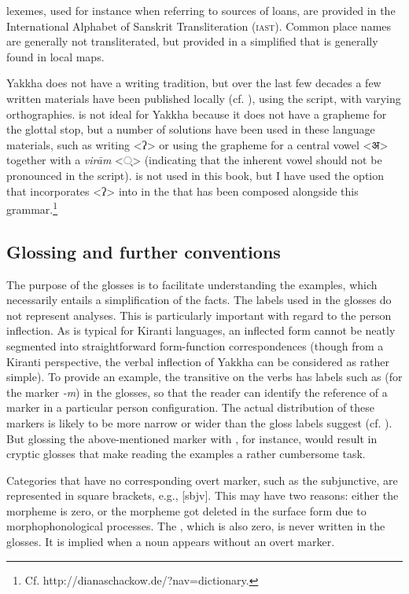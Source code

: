  lexemes, used for instance when referring to sources of loans, are provided in the International Alphabet of Sanskrit Transliteration (\textsc{iast}). Common place names are generally not transliterated, but provided in a simplified  that is generally found in local maps.

Yakkha does not have a writing tradition, but over the last few decades a few written materials have been published locally (cf. ), using the  script, with varying orthographies.  is not ideal for Yakkha because it does not have a grapheme for the glottal stop, but a number of solutions have been used in these language materials, such as writing <ʔ>  or using the grapheme for a central vowel <{\Deva अ}> together with a \emph{virām} <{\Deva  ्}>  (indicating that the inherent vowel should not be pronounced in the  script).   is not used in this book, but  I have used the option that incorporates <ʔ> into  in the  that has been composed alongside this grammar.\footnote{Cf. http://dianaschackow.de/?nav=dictionary.}


\subsection{Glossing and further conventions}

The purpose of the glosses is to facilitate understanding the examples, which necessarily entails a simplification of the facts. The labels used in the glosses do not represent analyses. This is particularly important with regard to the person inflection. As is typical for Kiranti languages, an inflected form cannot be neatly segmented into straightforward form-function correspondences (though from a  Kiranti perspective, the verbal inflection of Yakkha can be considered as rather simple). To provide an example, the transitive  on the verbs has labels such as  (for the marker \emph{-m}) in the glosses, so that the reader can identify the reference of a marker in a particular person configuration. The actual distribution of these markers is likely to be more narrow or wider than the gloss labels suggest (cf. ). But glossing the above-mentioned marker with , for instance, would result in cryptic glosses that make reading the examples a rather cumbersome task. 

Categories that have no corresponding overt marker, such as the subjunctive, are represented in square brackets, e.g., [{\sc sbjv}]. This may have two reasons: either the morpheme is zero, or the morpheme got deleted in the surface form due to morphophonological processes. The , which is also zero, is never written in the glosses. It is implied when a noun appears without an overt  marker. 

